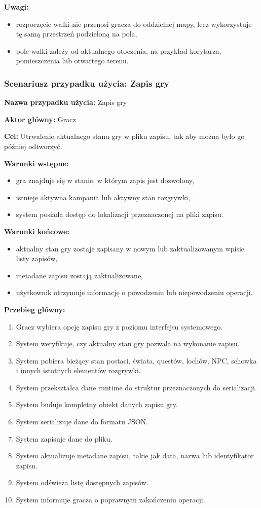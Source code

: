 \textbf{Uwagi:}
\begin{itemize}
    \item rozpoczęcie walki nie przenosi gracza do oddzielnej mapy, lecz wykorzystuje tę samą przestrzeń podzieloną na pola,
    \item pole walki zależy od aktualnego otoczenia, na przykład korytarza, pomieszczenia lub otwartego terenu.
\end{itemize}

\subsubsection*{Scenariusz przypadku użycia: Zapis gry}

\textbf{Nazwa przypadku użycia:} Zapis gry

\textbf{Aktor główny:} Gracz

\textbf{Cel:} Utrwalenie aktualnego stanu gry w pliku zapisu, tak aby można było go później odtworzyć.

\textbf{Warunki wstępne:}
\begin{itemize}
    \item gra znajduje się w stanie, w którym zapis jest dozwolony,
    \item istnieje aktywna kampania lub aktywny stan rozgrywki,
    \item system posiada dostęp do lokalizacji przeznaczonej na pliki zapisu.
\end{itemize}

\textbf{Warunki końcowe:}
\begin{itemize}
    \item aktualny stan gry zostaje zapisany w nowym lub zaktualizowanym wpisie listy zapisów,
    \item metadane zapisu zostają zaktualizowane,
    \item użytkownik otrzymuje informację o powodzeniu lub niepowodzeniu operacji.
\end{itemize}

\textbf{Przebieg główny:}
\begin{enumerate}
    \item Gracz wybiera opcję zapisu gry z poziomu interfejsu systemowego.
    \item System weryfikuje, czy aktualny stan gry pozwala na wykonanie zapisu.
    \item System pobiera bieżący stan postaci, świata, questów, lochów, NPC, schowka i innych istotnych elementów rozgrywki.
    \item System przekształca dane runtime do struktur przeznaczonych do serializacji.
    \item System buduje kompletny obiekt danych zapisu gry.
    \item System serializuje dane do formatu JSON.
    \item System zapisuje dane do pliku.
    \item System aktualizuje metadane zapisu, takie jak data, nazwa lub identyfikator zapisu.
    \item System odświeża listę dostępnych zapisów.
    \item System informuje gracza o poprawnym zakończeniu operacji.
\end{enumerate}

